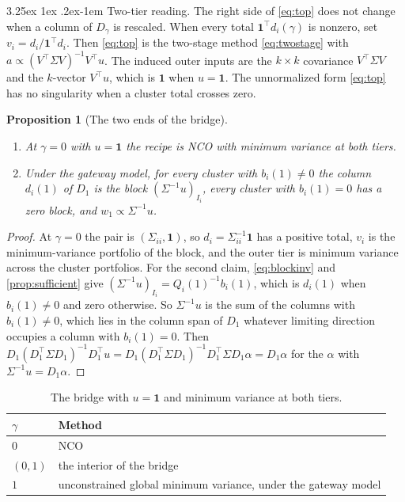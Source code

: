 \documentclass[11pt]{article}
\makeatletter
\renewcommand\paragraph{\@startsection{paragraph}{4}{\z@}%
  {3.25ex \@plus1ex \@minus.2ex}{-1em}%
  {\normalfont\normalsize\itshape}}
\newcommand{\ones}{\mathbf{1}}
\newtheorem{proposition}{Proposition}
\makeatother
\begin{document}
\paragraph{Two-tier reading.} The right side of \eqref{eq:top} does not
change when a column of $D_\gamma$ is rescaled. When every total
$\ones^\top d_i(\gamma)$ is nonzero, set $v_i=d_i/\ones^\top d_i$. Then
\eqref{eq:top} is the two-stage method \eqref{eq:twostage} with
$a\propto(V^\top\Sigma V)^{-1}V^\top u$. The induced outer inputs are the
$k\times k$ covariance $V^\top\Sigma V$ and the $k$-vector $V^\top u$, which
is $\ones$ when $u=\ones$. The unnormalized form \eqref{eq:top} has no
singularity when a cluster total crosses zero.

\begin{proposition}[The two ends of the bridge]
\label{prop:bridge}
\leavevmode
\begin{enumerate}
\item At $\gamma=0$ with $u=\ones$ the recipe is NCO with minimum variance
  at both tiers.
\item Under the gateway model, for every cluster with $b_i(1)\neq0$ the
  column $d_i(1)$ of $D_1$ is the block $(\Sigma^{-1}u)_{I_i}$, every
  cluster with $b_i(1)=0$ has a zero block, and $w_1\propto\Sigma^{-1}u$.
\end{enumerate}
\end{proposition}

\begin{proof}
At $\gamma=0$ the pair is $(\Sigma_{ii},\ones)$, so $d_i=\Sigma_{ii}^{-1}\ones$
has a positive total, $v_i$ is the minimum-variance portfolio of the block,
and the outer tier is minimum variance across the cluster portfolios. For
the second claim, \eqref{eq:blockinv} and \cref{prop:sufficient} give
$(\Sigma^{-1}u)_{I_i}=Q_i(1)^{-1}b_i(1)$, which is $d_i(1)$ when
$b_i(1)\neq0$ and zero otherwise. So $\Sigma^{-1}u$ is the sum of the
columns with $b_i(1)\neq0$, which lies in the column span of $D_1$ whatever
limiting direction occupies a column with $b_i(1)=0$. Then
$D_1(D_1^\top\Sigma D_1)^{-1}D_1^\top u
=D_1(D_1^\top\Sigma D_1)^{-1}D_1^\top\Sigma D_1\alpha=D_1\alpha$ for the
$\alpha$ with $\Sigma^{-1}u=D_1\alpha$.
\end{proof}

\begin{table}[ht]
\centering
\begin{tabular}{@{}ll@{}}
\toprule
$\gamma$ & Method \\
\midrule
$0$ & NCO \cite{lopezdeprado2020} \\
$(0,1)$ & the interior of the bridge \\
$1$ & unconstrained global minimum variance, under the gateway model \\
\bottomrule
\end{tabular}
\caption{The bridge with $u=\ones$ and minimum variance at both tiers.}
\label{tab:bridge}
\end{table}
\end{document}
